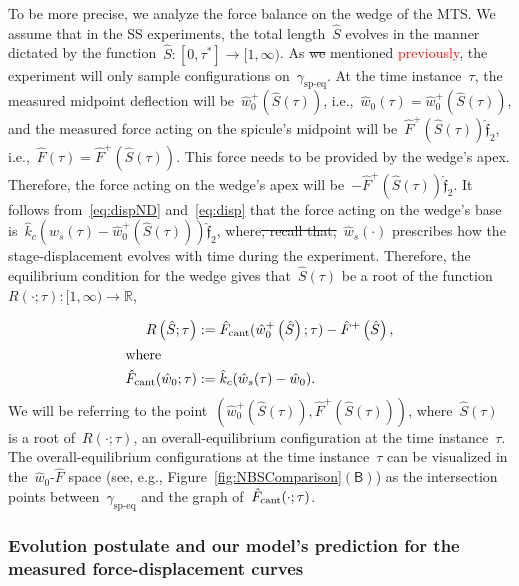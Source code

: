 \documentclass[preprint,10pt,times]{elsarticle}
\numberwithin{equation}{section}
\newcommand{\physf}{\hat{\boldsymbol{\mathfrak{f}}}}
\newcommand{\pr}[1]{\left( #1 \right)}
\newcommand{\subf}[1]{\pr{\textsf{#1}}}
\begin{document}
To be more precise, we analyze the force balance on the wedge of the MTS.
We assume that in the SS experiments, the total length~$\hat{S}$
evolves in the manner dictated by the function~$\hat{S}:[0,\tau^*]\to [1,\infty)$.
As \sout{we} mentioned \textcolor{red}{previously}, the experiment will only sample configurations on~$\gamma_{\text{sp-eq}}$.
At the time instance~$\tau$, the measured midpoint deflection will
be~$\hat{w}_0^{+}\pr{\hat{S}\pr{\tau}}$, i.e.,~$\hat{w}_0(\tau)=\hat{w}_0^{+}\pr{\hat{S}\pr{\tau}}$,
and the measured force acting on the spicule's midpoint will be~$\hat{F}^+\pr{\hat{S}(\tau)}\physf_{2}$,
i.e.,~$\hat{F}(\tau)=\hat{F}^+\pr{\hat{S}(\tau)}$. This force needs
to be provided by the wedge's apex. Therefore, the force acting on the wedge's
apex will be~$-\hat{F}^+\pr{\hat{S}(\tau)}\physf_{2}$. It follows
from~\eqref{eq:dispND} and~\eqref{eq:disp} that the force acting
on the wedge's base is~$\hat{k}_{c}\left(\hat{w}_{s}(\tau)-\hat{w}_{0}^+\pr{\hat{S}\pr{\tau}}\right)\physf_2$,
where\sout{, recall that,}~$\hat{w}_{s}(\cdot)$ prescribes how the stage-displacement
evolves with time during the experiment. Therefore, the equilibrium
condition for the wedge gives that~$\hat{S}(\tau)$ be a root of
the function~$R(\cdot;\tau):[1,\infty)\to\mathbb{R}$,

\begin{subequations}
\begin{align}
R\pr{\hat{S};\tau}&:=\hat{F}_{\rm cant}(\hat{w}_0^{+}\pr{\hat{S}};\tau)-\hat{F}^+\pr{\hat{S}},\\
\intertext{where}
\hat{F}_{\rm cant}(\hat{w}_0;\tau)&:=\hat{k}_c (\hat{w}_s(\tau)-\hat{w}_0).
\label{def:Fcant}
\end{align}
\label{eq:NonDimObliqueLine}
\end{subequations}We will be referring to the point~$\pr{\hat{w}_{0}^{+}\pr{\hat{S}\pr{\tau}},\hat{F}^{+}\pr{\hat{S}\pr{\tau}}}$,
where~$\hat{S}\pr{\tau}$ is a root of~$R(\cdot;\tau)$, an overall-equilibrium
configuration at the time instance~$\tau$. The overall-equilibrium
configurations at the time instance~$\tau$ can be visualized in
the~$\hat{w}_0$-$\hat{F}$ space (see, e.g., Figure~\ref{fig:NBSComparison}$\subf{B}$)
as the intersection points between~$\gamma_{\text{sp-eq}}$ and the
graph of~$\hat{F}_{\rm cant}(\cdot;\tau)$.

\subsubsection{Evolution postulate and our model's prediction for the measured force-displacement
curves\label{subsec:Evolution-postulate-and}}
\end{document}
